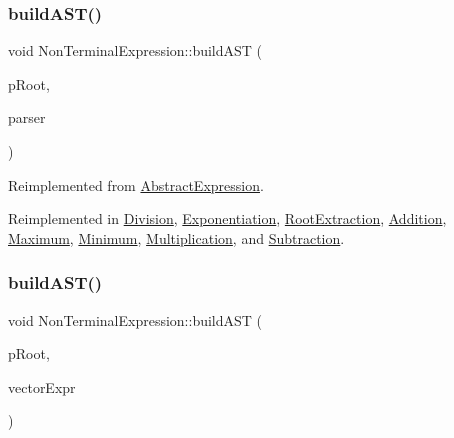 \subsubsection{\texorpdfstring{buildAST()}{buildAST()}\hspace{0.1cm}{\footnotesize\ttfamily [1/2]}}
{\footnotesize\ttfamily void Non\+Terminal\+Expression\+::build\+A\+ST (\begin{DoxyParamCaption}\item[{std\+::unique\+\_\+ptr$<$ \mbox{\hyperlink{class_abstract_expression}{Abstract\+Expression}} $>$ \&}]{p\+Root,  }\item[{\mbox{\hyperlink{class_parser}{Parser}} \&}]{parser }\end{DoxyParamCaption})\hspace{0.3cm}{\ttfamily [virtual]}}



Reimplemented from \mbox{\hyperlink{class_abstract_expression_a22801ba2c981103d20c8af71625a0b39}{Abstract\+Expression}}.



Reimplemented in \mbox{\hyperlink{class_division_a217df7aed2f8edd71bce9a196243fc81}{Division}}, \mbox{\hyperlink{class_exponentiation_a7c600d4b547358c563edfc76ae8ac8a6}{Exponentiation}}, \mbox{\hyperlink{class_root_extraction_a2c50c1676599c87fe480ae19cd701f1d}{Root\+Extraction}}, \mbox{\hyperlink{class_addition_a5cd97a6e56814cfe24a1211aeaab907f}{Addition}}, \mbox{\hyperlink{class_maximum_a55e8a52bc27e2cf0e1d99ca246ff7189}{Maximum}}, \mbox{\hyperlink{class_minimum_abec83657924b745c348bee1ef300e580}{Minimum}}, \mbox{\hyperlink{class_multiplication_a0bf6680544c5d519ae23597696938a2a}{Multiplication}}, and \mbox{\hyperlink{class_subtraction_a3473b659f19e10c5898c44ef964a1369}{Subtraction}}.

\mbox{\label{class_non_terminal_expression_a2bdcc38fdd63ba025df8bac517f7b8e8}} 
\subsubsection{\texorpdfstring{buildAST()}{buildAST()}\hspace{0.1cm}{\footnotesize\ttfamily [2/2]}}
{\footnotesize\ttfamily void Non\+Terminal\+Expression\+::build\+A\+ST (\begin{DoxyParamCaption}\item[{std\+::unique\+\_\+ptr$<$ \mbox{\hyperlink{class_abstract_expression}{Abstract\+Expression}} $>$ \&}]{p\+Root,  }\item[{std\+::vector$<$ std\+::unique\+\_\+ptr$<$ \mbox{\hyperlink{class_abstract_expression}{Abstract\+Expression}} $>$$>$ \&}]{vector\+Expr }\end{DoxyParamCaption})\hspace{0.3cm}{\ttfamily [virtual]}}

